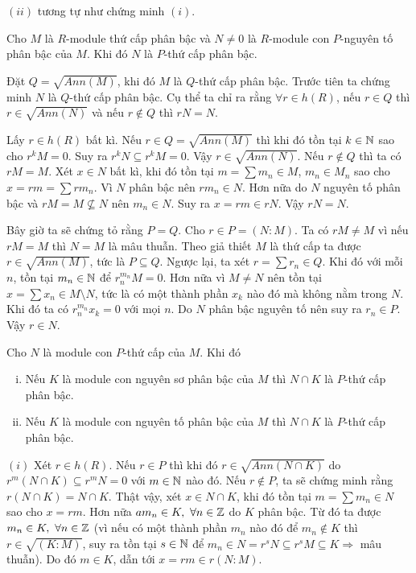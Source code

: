 \noindent
$(ii)$ tương tự như chứng minh $(i)$.

\begin{theorem}
    Cho $M$ là $R$-module thứ cấp phân bậc và $N \neq 0$ là $R$-module con $P$-nguyên tố phân bậc của $M$. Khi đó $N$ là $P$-thứ cấp phân bậc.
\end{theorem}
\startproof Đặt $Q = \sqrt{Ann(M)}$, khi đó $M$ là $Q$-thứ cấp phân bậc. Trước tiên ta chứng minh $N$ là $Q$-thứ cấp phân bậc. Cụ thể ta chỉ ra rằng $\forall r \in h(R)$, nếu $r \in Q$ thì $r \in \sqrt{Ann(N)}$ và nếu $r \notin Q$ thì $rN = N$.

Lấy $r \in h(R)$ bất kì. Nếu $r \in Q = \sqrt{Ann(M)}$ thì khi đó tồn tại $k \in \mathbb N$ sao cho $r^kM = 0$. Suy ra $r^kN \subseteq r^kM = 0$. Vậy $r \in \sqrt{Ann(N)}$. Nếu $r \notin Q$ thì ta có $rM = M$. Xét $x \in N$ bất kì, khi đó tồn tại $m = \sum m_n \in M$, $m_n \in M_n$ sao cho $x = rm = \sum rm_n$. Vì $N$ phân bậc nên $rm_n \in N$. Hơn nữa do $N$ nguyên tố phân bậc và $rM = M \not\subseteq N$ nên $m_n \in N$. Suy ra $x = rm \in rN$. Vậy $rN = N$.

Bây giờ ta sẽ chứng tỏ rằng $P = Q$. Cho $r \in P = (N:M)$. Ta có $rM \neq M$ vì nếu $rM = M$ thì $N = M$ là mâu thuẫn. Theo giả thiết $M$ là thứ cấp ta được $r \in \sqrt{Ann(M)}$, tức là $P \subseteq Q$. Ngược lại, ta xét $r = \sum r_n \in Q$. Khi đó với mỗi $n$, tồn tại $m_n \in \mathbb N$ để $r_n^{m_n}M = 0$. Hơn nữa vì $M \neq N$ nên tồn tại $x = \sum x_n \in M \setminus N$, tức là có một thành phần $x_k$ nào đó mà không nằm trong $N$. Khi đó ta có $r_n^{m_n} x_k = 0$ với mọi $n$. Do $N$ phân bậc nguyên tố nên suy ra $r_n \in P$. Vậy $r \in N$.\QED

\begin{lemma}
    \label{lem:secondaryCondition}
    Cho $N$ là module con $P$-thứ cấp của $M$. Khi đó
    \begin{enumerate}[(i)]
        \item Nếu $K$ là module con nguyên sơ phân bậc của $M$ thì $N \cap K$ là $P$-thứ cấp phân bậc.
        \item Nếu $K$ là module con nguyên tố phân bậc của $M$ thì $N \cap K$ là $P$-thứ cấp phân bậc.
    \end{enumerate}
\end{lemma}
\startproof $(i)$ Xét $r \in h(R)$. Nếu $r \in P$ thì khi đó $r \in \sqrt{Ann(N \cap K)}$ do $r^m(N \cap K) \subseteq r^mN = 0$ với $m \in \mathbb N$ nào đó. Nếu $r \notin P$, ta sẽ chứng minh rằng $r(N \cap K) = N \cap K$. Thật vậy, xét $x \in N \cap K$, khi đó tồn tại $m = \sum m_n \in N$ sao cho $x = rm$. Hơn nữa $am_n \in K,\ \forall n \in \mathbb Z$ do $K$ phân bậc. Từ đó ta được $m_n \in K,\ \forall n \in \mathbb Z$ (vì nếu có một thành phần $m_n$ nào đó để $m_n \notin K$ thì $r \in \sqrt{(K:M)}$, suy ra tồn tại $s \in \mathbb N$ để $m_n \in N = r^sN \subseteq r^sM \subseteq K \Rightarrow$ mâu thuẫn). Do đó $m \in K$, dẫn tới $x = rm \in r(N:M)$.

